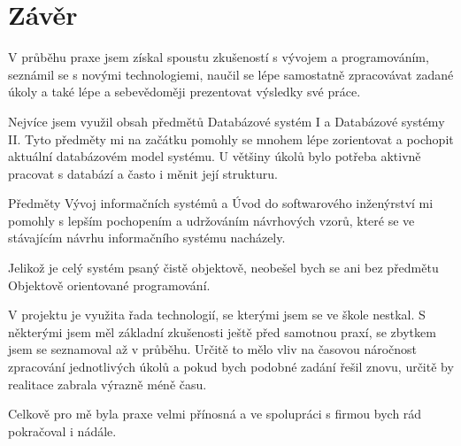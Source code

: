 \chapter{Závěr}
V průběhu praxe jsem získal spoustu zkušeností s vývojem a programováním, seznámil se s novými technologiemi, naučil se lépe samostatně zpracovávat zadané úkoly a také lépe a sebevědoměji prezentovat výsledky své práce. 

Nejvíce jsem využil obsah předmětů Databázové systém I a Databázové systémy II. Tyto předměty mi na začátku pomohly se mnohem lépe zorientovat a pochopit aktuální databázovém model systému. U většiny úkolů bylo potřeba aktivně pracovat s databází a často i měnit její strukturu.

Předměty Vývoj informačních systémů a Úvod do softwarového inženýrství mi pomohly s lepším pochopením a udržováním návrhových vzorů, které se ve stávajícím návrhu informačního systému nacházely. 

Jelikož je celý systém psaný čistě objektově, neobešel bych se ani bez předmětu Objektově orientované programování.

V projektu je využita řada technologií, se kterými jsem se ve škole nestkal. S některými jsem měl základní zkušenosti ještě před samotnou praxí, se zbytkem jsem se seznamoval až v průběhu. Určitě to mělo vliv na časovou náročnost zpracování jednotlivých úkolů a pokud bych podobné zadání řešil znovu, určitě by realitace zabrala výrazně méně času.

Celkově pro mě byla praxe velmi přínosná a ve spolupráci s firmou bych rád pokračoval i nádále.
\endinput